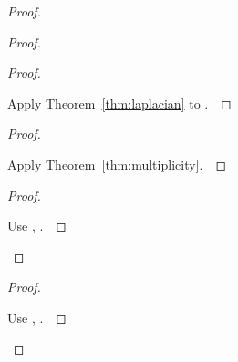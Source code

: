 \documentclass[11pt]{amsart}
\let\qed\relax
\theoremstyle{definition}
\begin{document}
\begin{proof}
\begin{proof}
\begin{proof}
\pf\ \raggedright Apply Theorem~\ref{thm:laplacian} to .~\qed
\end{proof}
\begin{proof}
\pf\ \raggedright Apply Theorem~\ref{thm:multiplicity}.~\qed
\end{proof}
\qedstep
\begin{proof}
\pf\ \raggedright Use , .~\qed
\end{proof}
\end{proof}
\qedstep
\begin{proof}
\pf\ \raggedright Use , .~\qed
\end{proof}
\end{proof}
\end{document}
